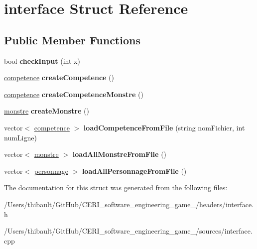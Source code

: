 \hypertarget{structinterface}{}\section{interface Struct Reference}
\label{structinterface}
\subsection*{Public Member Functions}
\begin{DoxyCompactItemize}
\item 
\mbox{\label{structinterface_ac62d78113444bf8a94024f04bf352b20}} 
bool {\bfseries check\+Input} (int x)
\item 
\mbox{\label{structinterface_a4572b6079e247818c0ed14676443d57c}} 
\hyperlink{classcompetence}{competence} {\bfseries create\+Competence} ()
\item 
\mbox{\label{structinterface_a2917ff8eb07888922d0ffb25c2900da5}} 
\hyperlink{classcompetence}{competence} {\bfseries create\+Competence\+Monstre} ()
\item 
\mbox{\label{structinterface_aa34f1425be9cb347194599eb185605f2}} 
\hyperlink{classmonstre}{monstre} {\bfseries create\+Monstre} ()
\item 
\mbox{\label{structinterface_a231b4d87c2a9caf3e4976a963a7b7ef4}} 
vector$<$ \hyperlink{classcompetence}{competence} $>$ {\bfseries load\+Competence\+From\+File} (string nom\+Fichier, int num\+Ligne)
\item 
\mbox{\label{structinterface_a1c5e6f874ded2c9ebc8e4a4c05a024b6}} 
vector$<$ \hyperlink{classmonstre}{monstre} $>$ {\bfseries load\+All\+Monstre\+From\+File} ()
\item 
\mbox{\label{structinterface_a49bf88b3e031fa6399471b72de1c7959}} 
vector$<$ \hyperlink{classpersonnage}{personnage} $>$ {\bfseries load\+All\+Personnage\+From\+File} ()
\end{DoxyCompactItemize}


The documentation for this struct was generated from the following files\+:\begin{DoxyCompactItemize}
\item 
/\+Users/thibault/\+Git\+Hub/\+C\+E\+R\+I\+\_\+software\+\_\+engineering\+\_\+game\+\_/headers/interface.\+h\item 
/\+Users/thibault/\+Git\+Hub/\+C\+E\+R\+I\+\_\+software\+\_\+engineering\+\_\+game\+\_/sources/interface.\+cpp\end{DoxyCompactItemize}
